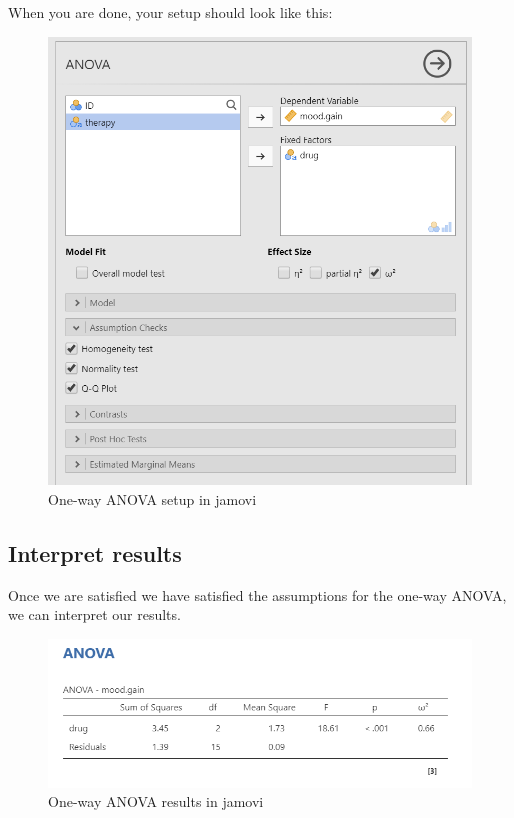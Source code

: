 \documentclass[
]{book}
\begin{document}
When you are done, your setup should look like this:

\begin{figure}

{\centering \includegraphics[width=0.8\linewidth]{images/04_one-way-anova/one-way_setup} 

}

\caption{One-way ANOVA setup in jamovi}\label{fig:unnamed-chunk-3}
\end{figure}

\hypertarget{interpret-results-4}{%
\subsection{Interpret results}\label{interpret-results-4}}

Once we are satisfied we have satisfied the assumptions for the one-way ANOVA, we can interpret our results.

\begin{figure}

{\centering \includegraphics[width=1\linewidth]{images/04_one-way-anova/one-way_results} 

}

\caption{One-way ANOVA results in jamovi}\label{fig:unnamed-chunk-4}
\end{figure}
\end{document}
